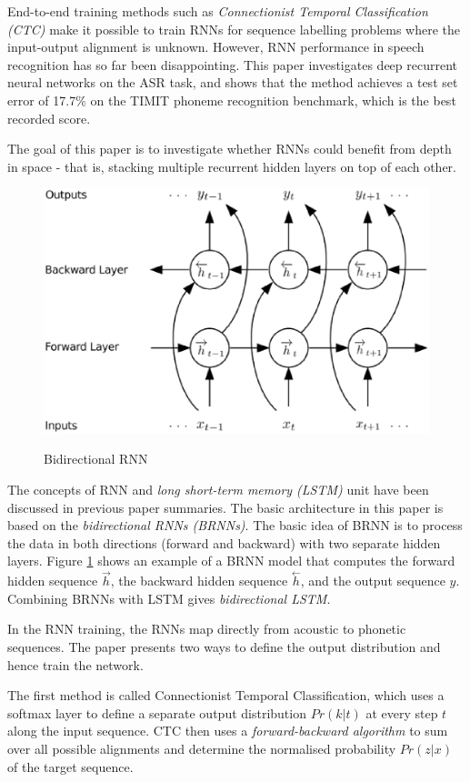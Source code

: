 \documentclass[paper=a4, fontsize=18pt]{article} %
\numberwithin{equation}{section} %
\numberwithin{figure}{section} %
\numberwithin{table}{section} %
\begin{document}
End-to-end training methods such as \emph{Connectionist Temporal Classification (CTC)} make it possible to train RNNs for sequence labelling problems where the input-output alignment is unknown. However, RNN performance in speech recognition has so far been disappointing. This paper investigates deep recurrent neural networks on the ASR task, and shows that the method achieves a test set error of 17.7\% on the TIMIT phoneme recognition benchmark, which is the best recorded score.

The goal of this paper is to investigate whether RNNs could benefit from depth in space - that is, stacking multiple recurrent hidden layers on top of each other.

\begin{figure}[htbp]
  \centering
  \includegraphics[width=.5\linewidth]{10_17_ASR_RNN}\\
  \caption{Bidirectional RNN}\label{fig:ASR_RNN}
\end{figure}

The concepts of RNN and \emph{long short-term memory (LSTM)} unit have been discussed in previous paper summaries. The basic architecture in this paper is based on the \emph{bidirectional RNNs (BRNNs)}. The basic idea of BRNN is to process the data in both directions (forward and backward) with two separate hidden layers. Figure \ref{fig:ASR_RNN} shows an example of a BRNN model that computes the forward hidden sequence $\stackrel{\rightarrow}{h}$, the backward hidden sequence $\stackrel{\leftarrow}{h}$, and the output sequence $y$. Combining BRNNs with LSTM gives \emph{bidirectional LSTM}.

In the RNN training, the RNNs map directly from acoustic to phonetic sequences. The paper presents two ways to define the output distribution and hence train the network.

The first method is called Connectionist Temporal Classification, which uses a softmax layer to define a separate output distribution $Pr(k|t)$ at every step $t$ along the input sequence. CTC then uses a \emph{forward-backward algorithm} to sum over all possible alignments and determine the normalised probability $Pr(z|x)$ of the target sequence.
\end{document}
